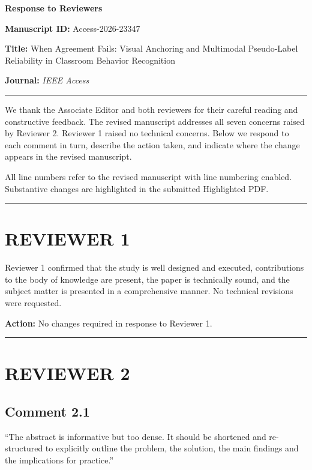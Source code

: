 \documentclass[11pt]{article}
\begin{document}
\begin{center}
{\Large \textbf{Response to Reviewers}}
\end{center}

\textbf{Manuscript ID:} Access-2026-23347

\textbf{Title:} When Agreement Fails: Visual Anchoring and Multimodal Pseudo-Label Reliability in Classroom Behavior Recognition

\textbf{Journal:} \textit{IEEE Access}

\rule{\textwidth}{0.4pt}

We thank the Associate Editor and both reviewers for their careful reading and constructive feedback. The revised manuscript addresses all seven concerns raised by Reviewer 2. Reviewer 1 raised no technical concerns. Below we respond to each comment in turn, describe the action taken, and indicate where the change appears in the revised manuscript.

All line numbers refer to the revised manuscript with line numbering enabled. Substantive changes are highlighted in the submitted Highlighted PDF.

\rule{\textwidth}{0.4pt}

\section*{REVIEWER 1}

Reviewer 1 confirmed that the study is well designed and executed, contributions to the body of knowledge are present, the paper is technically sound, and the subject matter is presented in a comprehensive manner. No technical revisions were requested.

\textbf{Action:} No changes required in response to Reviewer 1.

\rule{\textwidth}{0.4pt}

\section*{REVIEWER 2}

\subsection*{Comment 2.1}

``The abstract is informative but too dense. It should be shortened and re-structured to explicitly outline the problem, the solution, the main findings and the implications for practice.''
\end{document}

